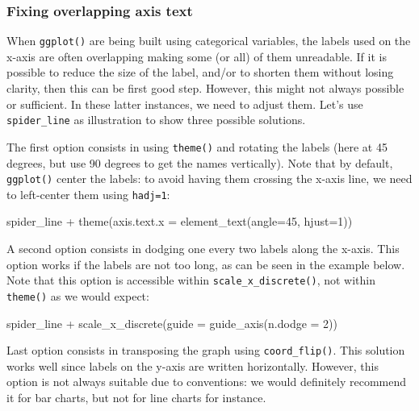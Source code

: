 \documentclass[
]{book}
\newenvironment{Shaded}{\begin{snugshade}}{\end{snugshade}}
\newcommand{\AttributeTok}[1]{\textcolor[rgb]{0.77,0.63,0.00}{#1}}
\newcommand{\DecValTok}[1]{\textcolor[rgb]{0.00,0.00,0.81}{#1}}
\newcommand{\FunctionTok}[1]{\textcolor[rgb]{0.00,0.00,0.00}{#1}}
\newcommand{\NormalTok}[1]{#1}
\newcommand{\SpecialCharTok}[1]{\textcolor[rgb]{0.00,0.00,0.00}{#1}}
\begin{document}
\hypertarget{fixing-overlapping-axis-text}{%
\subsubsection{Fixing overlapping axis text}\label{fixing-overlapping-axis-text}}

When \texttt{ggplot()} are being built using categorical variables, the labels used on the x-axis are often overlapping making some (or all) of them unreadable. If it is possible to reduce the size of the label, and/or to shorten them without losing clarity, then this can be first good step. However, this might not always possible or sufficient. In these latter instances, we need to adjust them. Let's use \texttt{spider\_line} as illustration to show three possible solutions.

The first option consists in using \texttt{theme()} and rotating the labels (here at 45 degrees, but use 90 degrees to get the names vertically). Note that by default, \texttt{ggplot()} center the labels: to avoid having them crossing the x-axis line, we need to left-center them using \texttt{hadj=1}:

\begin{Shaded}
\begin{Highlighting}[]
\NormalTok{spider\_line }\SpecialCharTok{+} 
  \FunctionTok{theme}\NormalTok{(}\AttributeTok{axis.text.x =} \FunctionTok{element\_text}\NormalTok{(}\AttributeTok{angle=}\DecValTok{45}\NormalTok{, }\AttributeTok{hjust=}\DecValTok{1}\NormalTok{))}
\end{Highlighting}
\end{Shaded}

A second option consists in dodging one every two labels along the x-axis. This option works if the labels are not too long, as can be seen in the example below. Note that this option is accessible within \texttt{scale\_x\_discrete()}, not within \texttt{theme()} as we would expect:

\begin{Shaded}
\begin{Highlighting}[]
\NormalTok{spider\_line }\SpecialCharTok{+} 
  \FunctionTok{scale\_x\_discrete}\NormalTok{(}\AttributeTok{guide =} \FunctionTok{guide\_axis}\NormalTok{(}\AttributeTok{n.dodge =} \DecValTok{2}\NormalTok{))}
\end{Highlighting}
\end{Shaded}

Last option consists in transposing the graph using \texttt{coord\_flip()}. This solution works well since labels on the y-axis are written horizontally. However, this option is not always suitable due to conventions: we would definitely recommend it for bar charts, but not for line charts for instance.
\end{document}
